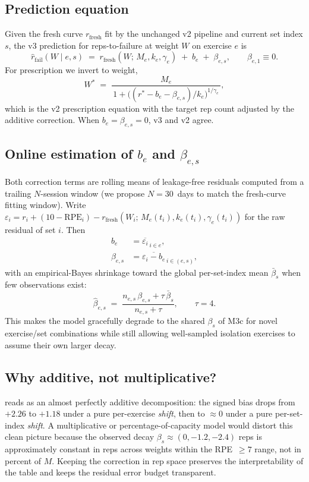 \documentclass[11pt]{article}
\begin{document}
\subsection{Prediction equation}
Given the fresh curve $r_\mathrm{fresh}$ fit by the unchanged v2 pipeline and current set index $s$, the v3 prediction for reps-to-failure at weight $W$ on exercise $e$ is
\begin{equation}
\label{eq:v3_pred}
\hat r_{\mathrm{fail}}(W \mid e, s) \;=\; r_\mathrm{fresh}(W;\,M_e,k_e,\gamma_e) \;+\; b_e \;+\; \beta_{e,s},
\qquad \beta_{e,1}\equiv 0.
\end{equation}
For prescription we invert to weight,
\begin{equation}
\label{eq:v3_inv}
W^* \;=\; \frac{M_e}{\,1 + \bigl((r^* - b_e - \beta_{e,s})/k_e\bigr)^{1/\gamma_e}\,},
\end{equation}
which is the v2 prescription equation with the target rep count adjusted by the additive correction.
When $b_e = \beta_{e,s} = 0$, v3 and v2 agree.

\subsection{Online estimation of \texorpdfstring{$b_e$}{b\_e} and \texorpdfstring{$\beta_{e,s}$}{beta\_\{e,s\}}}
Both correction terms are rolling means of leakage-free residuals computed from a trailing $N$-session window (we propose $N=30$~days to match the fresh-curve fitting window).
Write $\varepsilon_i = r_i + (10-\mathrm{RPE}_i) - r_\mathrm{fresh}(W_i;\,M_e(t_i),k_e(t_i),\gamma_e(t_i))$ for the raw residual of set $i$.
Then
\begin{align}
\label{eq:be}
b_e     &= \overline{\varepsilon_i}_{\,i \in e},\\
\label{eq:bes}
\beta_{e,s} &= \overline{\varepsilon_i - b_e}_{\,i \in (e,s)} ,
\end{align}
with an empirical-Bayes shrinkage toward the global per-set-index mean $\bar\beta_s$ when few observations exist:
\begin{equation}
\label{eq:shrink}
\hat\beta_{e,s} \;=\; \frac{n_{e,s}\,\beta_{e,s} + \tau\,\bar\beta_s}{n_{e,s}+\tau},
\qquad \tau = 4.
\end{equation}
This makes the model gracefully degrade to the shared $\beta_s$ of M3c for novel exercise/set combinations while still allowing well-sampled isolation exercises to assume their own larger decay.

\subsection{Why additive, not multiplicative?}
 reads as an almost perfectly additive decomposition: the signed bias drops from $+2.26$ to $+1.18$ under a pure per-exercise \emph{shift}, then to $\approx 0$ under a pure per-set-index \emph{shift}.
A multiplicative or percentage-of-capacity model would distort this clean picture because the observed decay $\beta_s \approx (0, -1.2, -2.4)$ reps is approximately constant in reps across weights within the RPE~$\ge 7$ range, not in percent of $M$.
Keeping the correction in rep space preserves the interpretability of the table and keeps the residual error budget transparent.
\end{document}
